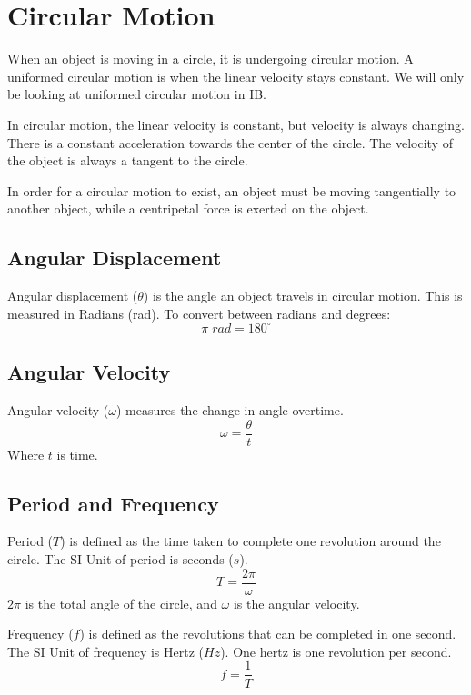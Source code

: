 \documentclass[../notes.tex]{subfiles}
\begin{document}
\section{Circular Motion}
When an object is moving in a circle, it is undergoing circular motion.
A uniformed circular motion is when the linear velocity stays constant.
We will only be looking at uniformed circular motion in IB.

In circular motion, the linear velocity is constant, but velocity is always changing.
There is a constant acceleration towards the center of the circle.
The velocity of the object is always a tangent to the circle.

In order for a circular motion to exist, an object must be moving tangentially to another object, while a centripetal force is exerted on the object.

\subsection{Angular Displacement}
Angular displacement ($\theta$) is the angle an object travels in circular motion.
This is measured in Radians (rad).
To convert between radians and degrees:
\begin{equation}
	\pi\; rad = 180^\circ
\end{equation}

\subsection{Angular Velocity}
Angular velocity ($\omega$) measures the change in angle overtime.
\begin{equation}
	\omega = \frac{\theta}{t}
\end{equation}
Where $t$ is time.

\subsection{Period and Frequency}
Period ($T$) is defined as the time taken to complete one revolution around the circle.
The SI Unit of period is seconds ($s$).
\begin{equation}
	T = \frac{2\pi}{\omega}
\end{equation}
$2\pi$ is the total angle of the circle, and $\omega$ is the angular velocity.

Frequency ($f$) is defined as the revolutions that can be completed in one second.
The SI Unit of frequency is Hertz ($Hz$).
One hertz is one revolution per second.
\begin{equation}
	f = \frac{1}{T}
\end{equation}
\end{document}
